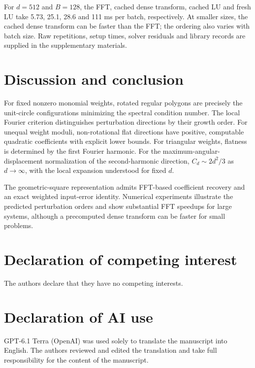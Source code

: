 \documentclass[10pt,twoside,final]{siamart1116}
\numberwithin{equation}{section}
\numberwithin{theorem}{section}
\begin{document}
For $d=512$ and $B=128$, the FFT, cached dense transform, cached LU and fresh LU
take 5.73, 25.1, 28.6 and 111 ms per batch, respectively. 
At smaller sizes, the cached dense transform can be faster than the FFT;
the ordering also varies with batch size. Raw repetitions, setup times,
solver residuals and library records are supplied in the supplementary materials.

\FloatBarrier
\section{Discussion and conclusion}\label{sec:conclusion}

For fixed nonzero monomial weights, rotated regular polygons are precisely the
unit-circle configurations minimizing the spectral condition number. The local
Fourier criterion distinguishes perturbation directions by their growth order.
For unequal weight moduli, non-rotational flat directions have positive,
computable quadratic coefficients with explicit lower bounds. For triangular
weights, flatness is determined by the first Fourier harmonic. For the
maximum-angular-displacement normalization of the second-harmonic direction,
$C_d\sim 2d^2/3$ as $d\to\infty$, with the local expansion understood for fixed $d$.

The geometric-square representation admits FFT-based coefficient recovery
and an exact weighted input-error identity. Numerical experiments illustrate
the predicted perturbation orders and show substantial FFT speedups for large
systems, although a precomputed dense transform can be faster for small
problems.

\section*{Declaration of competing interest}
The authors declare that they have no competing interests.

\section*{Declaration of AI use}
GPT-6.1 Terra (OpenAI) was used solely to translate the manuscript into English.
The authors reviewed and edited the translation and take full responsibility for
the content of the manuscript.
\end{document}
